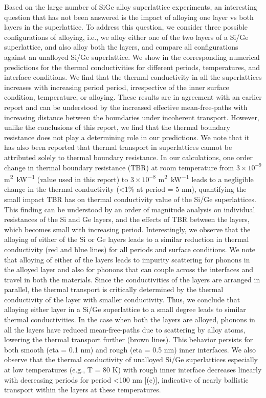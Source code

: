 \par Based on the large number of SiGe alloy superlattice experiments, an interesting question that has not been answered is the impact of alloying one layer vs both layers in the superlattice. To address this question, we consider three possible configurations of alloying, i.e., we alloy either one of the two layers of a Si/Ge superlattice, and also alloy both the layers, and compare all configurations against an unalloyed Si/Ge superlattice. We show in  the corresponding numerical predictions for the thermal conductivities for different periods, temperatures, and interface conditions. We find that the thermal conductivity in all the superlattices increases with increasing period \gls{period}, irrespective of the inner surface condition, temperature, or alloying. These results are in agreement with an earlier report \cite{RN267} and can be understood by the increased effective mean-free-paths with increasing distance between the boundaries under incoherent transport. However, unlike the conclusions of this report, we find that the thermal boundary resistance does not play a determining role in our predictions. We note that it has also been reported \cite{RN291} that thermal transport in superlattices cannot be attributed solely to thermal boundary resistance. In our calculations, one order change in thermal boundary resistance (TBR) at room temperature from $3\times 10^{-9}$ \si{\meter\squared\per\kilo\watt}  \cite{RN358} (value used in this report) to $3\times 10^{-8}$ \si{\meter\squared\per\kilo\watt} leads to a negligible change in the thermal conductivity (\textless1\% at \gls{period} = 5 nm), quantifying the small impact TBR has on thermal conductivity value of the Si/Ge superlattices. This finding can be understood by an order of magnitude analysis on individual resistances of the Si and Ge layers, and the effects of TBR between the layers, which becomes small with increasing period. Interestingly, we observe that the alloying of either of the Si or Ge layers leads to a similar reduction in thermal conductivity (red and blue lines) for all periods and surface conditions. We note that alloying of either of the layers leads to impurity scattering for phonons in the alloyed layer and also for phonons that can couple across the interfaces and travel in both the materials. Since the conductivities of the layers are arranged in parallel, the thermal transport is critically determined by the thermal conductivity of the layer with smaller conductivity. Thus, we conclude that alloying either layer in a Si/Ge superlattice to a small degree leads to similar thermal conductivities. In the case when both the layers are alloyed, phonons in all the layers have reduced mean-free-paths due to scattering by alloy atoms, lowering the thermal transport further (brown lines). This behavior persists for both smooth (\gls{eta} = 0.1 nm) and rough (\gls{eta} = 0.5 nm) inner interfaces. We also observe that the thermal conductivity of unalloyed Si/Ge superlattices especially at low temperatures (e.g., \gls{T} = 80 K) with rough inner interface decreases linearly with decreasing periods for \gls{period} \textless 100 nm [(c)], indicative of nearly ballistic transport within the layers at these temperatures.
